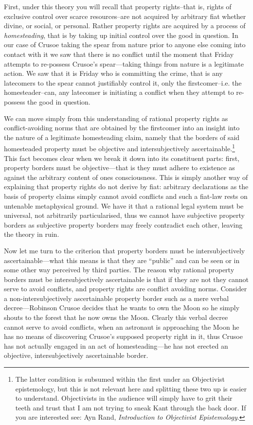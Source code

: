 \documentclass[11pt]{article}
\begin{document}
First, under this theory you will recall that property rights--that is, rights of exclusive control over scarce resources--are not acquired by arbitrary fiat whether divine, or social, or personal. Rather property rights are acquired by a process of \emph{homesteading}, that is by taking up initial control over the good in question. In our case of Crusoe taking the spear from nature prior to anyone else coming into contact with it we saw that there is no conflict until the moment that Friday attempts to re-possess Crusoe's spear---taking things from nature is a legitimate action. We saw that it is Friday who is committing the crime, that is any latecomers to the spear cannot justifiably control it, only the firstcomer--i.e. the homesteader--can, any latecomer is initiating a conflict when they attempt to re-possess the good in question.

We can move simply from this understanding of rational property rights as conflict-avoiding norms that are obtained by the firstcomer into an insight into the nature of a legitimate homesteading claim, namely that the borders of said homesteaded property must be objective and intersubjectively ascertainable.\footnote{The latter condition is subsumed within the first under an Objectivist epistemology, but this is not relevant here and splitting these two up is easier to understand. Objectivists in the audience will simply have to grit their teeth and trust that I am not trying to sneak Kant through the back door. If you are interested see: Ayn Rand, \emph{Introduction to Objectivist Epistemology}.} This fact becomes clear when we break it down into its constituent parts: first, property borders must be objective---that is they must adhere to existence as against the arbitrary content of ones consciousness. This is simply another way of explaining that property rights do not derive by fiat: arbitrary declarations as the basis of property claims simply cannot avoid conflicts and such a fiat-law rests on untenable metaphysical ground. We have it that a rational legal system must be universal, not arbitrarily particularised, thus we cannot have subjective property borders as subjective property borders may freely contradict each other, leaving the theory in ruin.

Now let me turn to the criterion that property borders must be intersubjectively ascertainable---what this means is that they are “public” and can be seen or in some other way perceived by third parties. The reason why rational property borders must be intersubjectively ascertainable is that if they are not they cannot serve to avoid conflicts, and property rights are conflict avoiding norms. Consider a non-intersubjectively ascertainable property border such as a mere verbal decree---Robinson Crusoe decides that he wants to own the Moon so he simply shouts to the forest that he now owns the Moon. Clearly this verbal decree cannot serve to avoid conflicts, when an astronaut is approaching the Moon he has no means of discovering Crusoe's supposed property right in it, thus Crusoe has not actually engaged in an act of homesteading---he has not erected an objective, intersubjectively ascertainable border.
\end{document}
